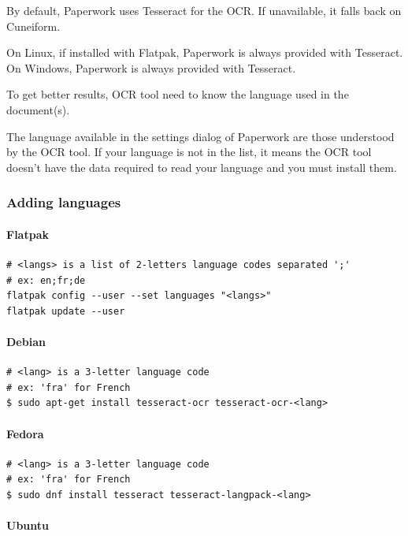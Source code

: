 \documentclass[10pt,a4paper]{article}
\begin{document}
By default, Paperwork uses Tesseract for the OCR. If unavailable,
it falls back on Cuneiform.

On Linux, if installed with Flatpak, Paperwork is always provided with
Tesseract. On Windows, Paperwork is always provided with Tesseract.

To get better results, OCR tool need to know the language used in
the document(s).

The language available in the settings dialog of Paperwork are those
understood by the OCR tool. If your language is not in the list, it
means the OCR tool doesn't have the data required to read your language
and you must install them.


\subsubsection{Adding languages}

\paragraph{Flatpak}

\begin{verbatim}
# <langs> is a list of 2-letters language codes separated ';'
# ex: en;fr;de
flatpak config --user --set languages "<langs>"
flatpak update --user
\end{verbatim}


\paragraph{Debian}

\begin{verbatim}
# <lang> is a 3-letter language code
# ex: 'fra' for French
$ sudo apt-get install tesseract-ocr tesseract-ocr-<lang>
\end{verbatim}

\paragraph{Fedora}

\begin{verbatim}
# <lang> is a 3-letter language code
# ex: 'fra' for French
$ sudo dnf install tesseract tesseract-langpack-<lang>
\end{verbatim}

\paragraph{Ubuntu}
\end{document}
